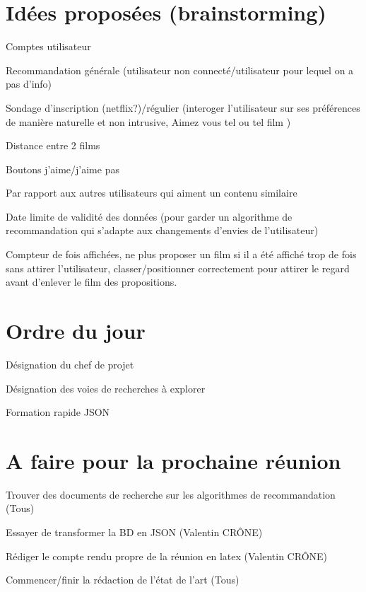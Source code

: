 \documentclass[11pt]{meetingmins}
\begin{document}
\section {Idées proposées (brainstorming)}
\begin{items}
	\item Comptes utilisateur
	\item Recommandation générale (utilisateur non connecté/utilisateur pour lequel on a pas d'info)
	\item Sondage d'inscription (netflix?)/régulier (interoger l'utilisateur sur ses préférences de manière naturelle et non intrusive, \og Aimez vous tel ou tel film \fg)
	\item Distance entre 2 films
	\item Boutons j'aime/j'aime pas
	\item Par rapport aux autres utilisateurs qui aiment un contenu similaire
	\item Date limite de validité des données (pour garder un algorithme de recommandation qui s'adapte aux changements d'envies de l'utilisateur)
	\item Compteur de fois affichées, ne plus proposer un film si il a été affiché trop de fois sans attirer l'utilisateur, classer/positionner correctement pour attirer le regard avant d'enlever le film des propositions.
\end{items}

\section {Ordre du jour}
\begin{items}
	\item Désignation du chef de projet
	\item Désignation des voies de recherches à explorer
	\item Formation rapide JSON
\end{items}

\section {A faire pour la prochaine réunion}
\begin{items}
	\item Trouver des documents de recherche sur les algorithmes de recommandation (Tous)
	\item Essayer de transformer la BD en JSON (Valentin CRÔNE)
	\item Rédiger le compte rendu propre de la réunion en latex (Valentin CRÔNE)
	\item Commencer/finir la rédaction de l'état de l'art (Tous)
\end{items}
\vspace{1cm}
\end{document}
